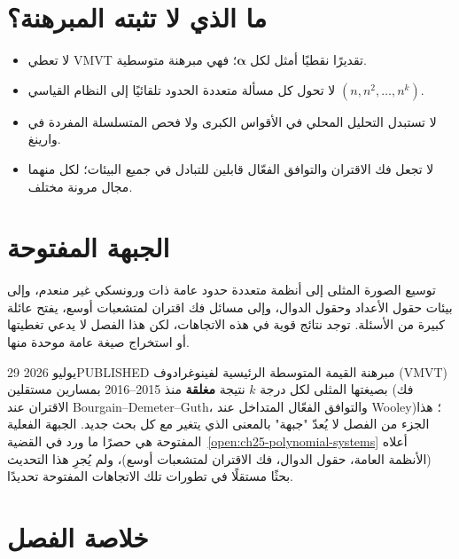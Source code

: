 \section{ما الذي لا تثبته المبرهنة؟}

\begin{itemize}
  \item لا تعطي VMVT تقديرًا نقطيًا أمثل لكل \(\boldsymbol\alpha\)؛ فهي مبرهنة متوسطية.
  \item لا تحول كل مسألة متعددة الحدود تلقائيًا إلى النظام القياسي \((n,n^2,\ldots,n^k)\).
  \item لا تستبدل التحليل المحلي في الأقواس الكبرى ولا فحص المتسلسلة المفردة في وارينغ.
  \item لا تجعل فك الاقتران والتوافق الفعّال قابلين للتبادل في جميع البيئات؛ لكل منهما مجال مرونة مختلف.
\end{itemize}

\section{الجبهة المفتوحة}

\begin{openproblem}
\label{open:ch25-polynomial-systems}
\openresult
توسيع الصورة المثلى إلى أنظمة متعددة حدود عامة ذات ورونسكي غير منعدم، وإلى بيئات حقول الأعداد وحقول الدوال، وإلى مسائل فك اقتران لمتشعبات أوسع، يفتح عائلة كبيرة من الأسئلة. توجد نتائج قوية في هذه الاتجاهات، لكن هذا الفصل لا يدعي تغطيتها أو استخراج صيغة عامة موحدة منها.
\end{openproblem}

\begin{frontiercard}{29 يوليو 2026}{PUBLISHED}{\cite{bourgainDemeterGuth2016vmvt,wooley2019nested}}
مبرهنة القيمة المتوسطة الرئيسية لفينوغرادوف (VMVT) بصيغتها المثلى لكل درجة \(k\) نتيجة \textbf{مغلقة} منذ 2015--2016 بمسارين مستقلين (فك الاقتران عند Bourgain--Demeter--Guth، والتوافق الفعّال المتداخل عند Wooley)؛ هذا الجزء من الفصل لا يُعدّ "جبهة" بالمعنى الذي يتغير مع كل بحث جديد. الجبهة الفعلية المفتوحة هي حصرًا ما ورد في القضية~\ref{open:ch25-polynomial-systems} أعلاه (الأنظمة العامة، حقول الدوال، فك الاقتران لمتشعبات أوسع)، ولم يُجرِ هذا التحديث بحثًا مستقلًا في تطورات تلك الاتجاهات المفتوحة تحديدًا.
\end{frontiercard}

\section*{خلاصة الفصل}

